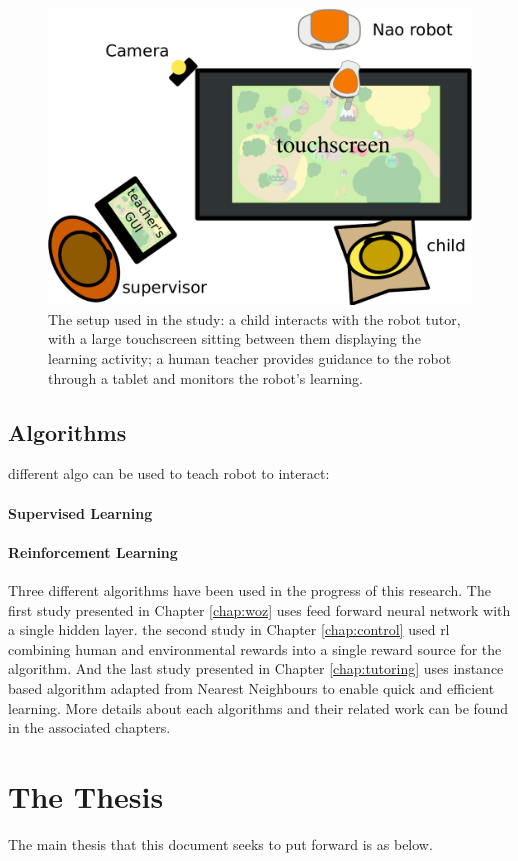 \begin{figure}[ht]
	\includegraphics[width=.4\linewidth]{setup.pdf}
	\centering
	\caption{The setup used in the study: a child interacts with the robot tutor, with a large touchscreen sitting between them displaying the learning activity; a human teacher provides guidance to the robot through a tablet and monitors the robot's learning.}
	\label{fig:setup}
\end{figure}

\subsection{Algorithms}

different algo can be used to teach robot to interact:

\paragraph{Supervised Learning}

\paragraph{Reinforcement Learning}

Three different algorithms have been used in the progress of this research. The first study presented in Chapter \ref{chap:woz} uses feed forward neural network with a single hidden layer. the second study in Chapter \ref{chap:control} used \acrlong{rl} combining human and environmental rewards into a single reward source for the algorithm. And the last study presented in Chapter \ref{chap:tutoring} uses instance based algorithm adapted from Nearest Neighbours to enable quick and efficient learning. More details about each algorithms and their related work can be found in the associated chapters.

\section{The Thesis}\label{sec:intro-thesis}
The main thesis that this document seeks to put forward is as below.

